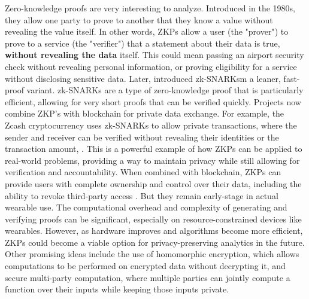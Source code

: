 	Zero-knowledge proofs are very interesting to analyze. Introduced in the 1980s, they allow one party to prove to another that they know a value without revealing the value itself. In other words, ZKPs allow a user (the "prover") to prove to a service (the "verifier") that a statement about their data is true, \textbf{without revealing the data} itself. This could mean passing an airport security check without revealing personal information, or proving eligibility for a service without disclosing sensitive data. Later, \cite{BenSasson2019} introduced zk-SNARKsm a leaner, fast-proof variant. zk-SNARKs are a type of zero-knowledge proof that is particularly efficient, allowing for very short proofs that can be verified quickly. Projects now combine ZKP's with blockchain for private data exchange. For example, the Zcash cryptocurrency uses zk-SNARKs to allow private transactions, where the sender and receiver can be verified without revealing their identities or the transaction amount, \cite{BenSasson2014}. This is a powerful example of how ZKPs can be applied to real-world problems, providing a way to maintain privacy while still allowing for verification and accountability. When combined with blockchain, ZKPs can provide users with complete ownership and control over their data, including the ability to revoke third-party access \cite{Zhou2023}. But they remain early-stage in actual wearable use. The computational overhead and complexity of generating and verifying proofs can be significant, especially on resource-constrained devices like wearables. However, as hardware improves and algorithms become more efficient, ZKPs could become a viable option for privacy-preserving analytics in the future.
	Other promising ideas include the use of homomorphic encryption, which allows computations to be performed on encrypted data without decrypting it, and secure multi-party computation, where multiple parties can jointly compute a function over their inputs while keeping those inputs private. 

